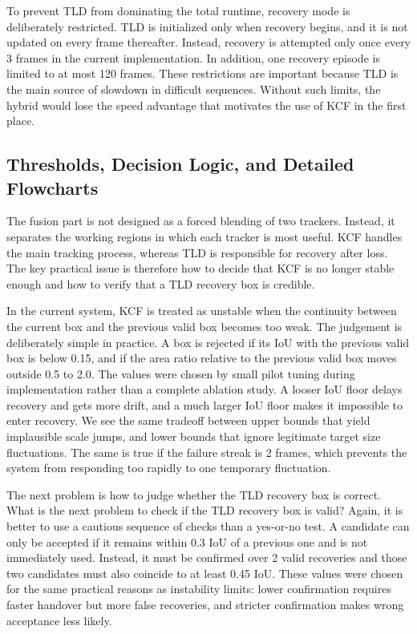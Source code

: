 \documentclass[12pt,a4paper]{article}
\begin{document}
To prevent TLD from dominating the total runtime, recovery mode is deliberately restricted. TLD is initialized only when recovery begins, and it is not updated on every frame thereafter. Instead, recovery is attempted only once every 3 frames in the current implementation. In addition, one recovery episode is limited to at most 120 frames. These restrictions are important because TLD is the main source of slowdown in difficult sequences. Without such limits, the hybrid would lose the speed advantage that motivates the use of KCF in the first place.

\subsection{Thresholds, Decision Logic, and Detailed Flowcharts}
The fusion part is not designed as a forced blending of two trackers. Instead, it separates the working regions in which each tracker is most useful. KCF handles the main tracking process, whereas TLD is responsible for recovery after loss. The key practical issue is therefore how to decide that KCF is no longer stable enough and how to verify that a TLD recovery box is credible.

In the current system, KCF is treated as unstable when the continuity between the current box and the previous valid box becomes too weak. The judgement is deliberately simple in practice. A box is rejected if its IoU with the previous valid box is below 0.15, and if the area ratio relative to the previous valid box moves outside 0.5 to 2.0. The values were chosen by small pilot tuning during implementation rather than a complete ablation study. A looser IoU floor delays recovery and gets more drift, and a much larger IoU floor makes it impossible to enter recovery. We see the same tradeoff between upper bounds that yield implausible scale jumps, and lower bounds that ignore legitimate target size fluctuations. The same is true if the failure streak is 2 frames, which prevents the system from responding too rapidly to one temporary fluctuation.

The next problem is how to judge whether the TLD recovery box is correct. What is the next problem to check if the TLD recovery box is valid? Again, it is better to use a cautious sequence of checks than a yes-or-no test. A candidate can only be accepted if it remains within 0.3 IoU of a previous one and is not immediately used. Instead, it must be confirmed over 2 valid recoveries and those two candidates must also coincide to at least 0.45 IoU. These values were chosen for the same practical reasons as instability limits: lower confirmation requires faster handover but more false recoveries, and stricter confirmation makes wrong acceptance less likely.
\end{document}
